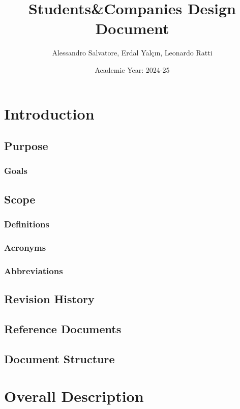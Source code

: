 \documentclass[a4paper,12pt]{article}
\begin{document}
\title{Students\&Companies Design Document} %
\author{Alessandro Salvatore, Erdal Yalçın, Leonardo Ratti}
\date{Academic Year: 2024-25}
\maketitle


\newpage
\tableofcontents
\section{Introduction}
\subsection{Purpose}
\subsubsection{Goals}
\subsection{Scope}
\subsubsection{Definitions}
\subsubsection{Acronyms}
\subsubsection{Abbreviations}
\subsection{Revision History}
\subsection{Reference Documents}
\subsection{Document Structure}

\section{Overall Description}
\end{document}
